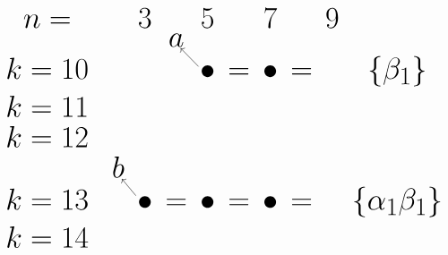 \documentclass{article}
\begin{document}
\(
\begin{tikzcd}[
nodes={font=\Huge,inner sep=1pt},
row sep=0.1cm,
column sep=0.3cm
]
n= && & 3 & & 5 & & 7 & & 9 & & \\
&& && a \\ \\
k=10 &&& && \bullet\arrow[luu] &=& \bullet &=& & \{\beta_1\}  \\ \\
k=11 &&& && \\ \\
k=12 &&& && \\ \\
&& b \\ \\
k=13 &&& \bullet\arrow[luu] &=& \bullet &=& \bullet &=& & \{\alpha_1\beta_1\}  \\ \\
k=14 &&& && \\ \\
\\
\end{tikzcd}
\)
\end{document}
